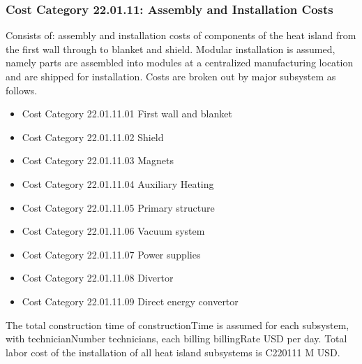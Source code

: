 \subsubsection*{Cost Category 22.01.11: Assembly and Installation Costs}

Consists of: assembly and installation costs of components of the heat island from the first wall through to blanket and shield. Modular installation is assumed, namely parts are assembled into modules at a centralized manufacturing location and are shipped for installation. Costs are broken out by major subsystem as follows.

\begin{itemize}
    \item Cost Category 22.01.11.01 First wall and blanket
    \item Cost Category 22.01.11.02 Shield
    \item Cost Category 22.01.11.03 Magnets
    \item Cost Category 22.01.11.04 Auxiliary Heating
    \item Cost Category 22.01.11.05 Primary structure
    \item Cost Category 22.01.11.06 Vacuum system
    \item Cost Category 22.01.11.07 Power supplies
    \item Cost Category 22.01.11.08 Divertor
    \item Cost Category 22.01.11.09 Direct energy convertor
\end{itemize}

The total construction time of constructionTime is assumed for each subsystem, with technicianNumber technicians, each billing billingRate USD per day.  Total labor cost of the installation of all heat island subsystems is C220111 M USD.